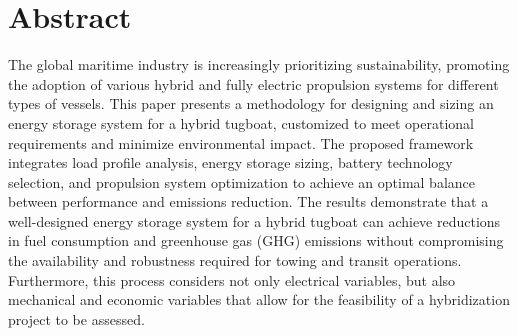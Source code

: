 \chapter{Abstract}
The global maritime industry is increasingly prioritizing sustainability, promoting the adoption of various hybrid and fully electric propulsion systems for different types of vessels. This paper presents a methodology for designing and sizing an energy storage system for a hybrid tugboat, customized to meet operational requirements and minimize environmental impact. The proposed framework integrates load profile analysis, energy storage sizing, battery technology selection, and propulsion system optimization to achieve an optimal balance between performance and emissions reduction. The results demonstrate that a well-designed energy storage system for a hybrid tugboat can achieve reductions in fuel consumption and greenhouse gas (GHG) emissions without compromising the availability and robustness required for towing and transit operations. Furthermore, this process considers not only electrical variables, but also mechanical and economic variables that allow for the feasibility of a hybridization project to be assessed.
